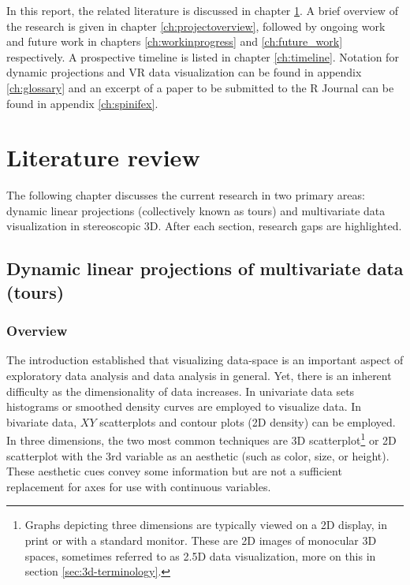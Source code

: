 \documentclass{monashthesis}
\begin{document}
In this report, the related literature is discussed in chapter \ref{ch:lit_review}. A brief overview of the research is given in chapter \ref{ch:projectoverview}, followed by ongoing work and future work in chapters \ref{ch:workinprogress} and \ref{ch:future_work} respectively. A prospective timeline is listed in chapter \ref{ch:timeline}. Notation for dynamic projections and VR data visualization can be found in appendix \ref{ch:glossary} and an excerpt of a paper to be submitted to the R Journal can be found in appendix \ref{ch:spinifex}.

\hypertarget{ch:lit_review}{%
\chapter{Literature review}\label{ch:lit_review}}

The following chapter discusses the current research in two primary areas: dynamic linear projections (collectively known as tours) and multivariate data visualization in stereoscopic 3D. After each section, research gaps are highlighted.

\hypertarget{sec:tour}{%
\section{Dynamic linear projections of multivariate data (tours)}\label{sec:tour}}

\hypertarget{overview}{%
\subsection{Overview}\label{overview}}

The introduction established that visualizing data-space is an important aspect of exploratory data analysis and data analysis in general. Yet, there is an inherent difficulty as the dimensionality of data increases. In univariate data sets histograms or smoothed density curves are employed to visualize data. In bivariate data, \(XY\) scatterplots and contour plots (2D density) can be employed. In three dimensions, the two most common techniques are 3D scatterplot\footnote{Graphs depicting three dimensions are typically viewed on a 2D display, in print or with a standard monitor. These are 2D images of monocular 3D spaces, sometimes referred to as 2.5D data visualization, more on this in section \ref{sec:3d-terminology}.} or 2D scatterplot with the 3rd variable as an aesthetic (such as color, size, or height). These aesthetic cues convey some information but are not a sufficient replacement for axes for use with continuous variables.
\end{document}
